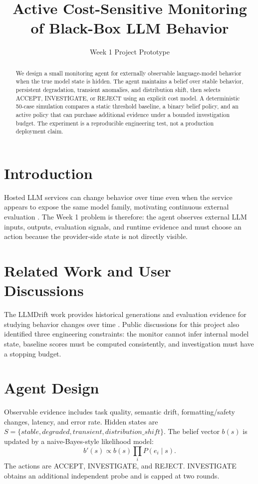 \documentclass[10pt]{article}
\title{Active Cost-Sensitive Monitoring of Black-Box LLM Behavior}
\author{Week 1 Project Prototype}
\date{}
\begin{document}
\maketitle
\begin{abstract}
We design a small monitoring agent for externally observable language-model behavior when the true model state is hidden. The agent maintains a belief over stable behavior, persistent degradation, transient anomalies, and distribution shift, then selects ACCEPT, INVESTIGATE, or REJECT using an explicit cost model. A deterministic 50-case simulation compares a static threshold baseline, a binary belief policy, and an active policy that can purchase additional evidence under a bounded investigation budget. The experiment is a reproducible engineering test, not a production deployment claim.
\end{abstract}

\section{Introduction}
Hosted LLM services can change behavior over time even when the service appears to expose the same model family, motivating continuous external evaluation \cite{chen2023llmdrift}. The Week 1 problem is therefore: the agent observes external LLM inputs, outputs, evaluation signals, and runtime evidence and must choose an action because the provider-side state is not directly visible.

\section{Related Work and User Discussions}
The LLMDrift work provides historical generations and evaluation evidence for studying behavior changes over time \cite{chen2023llmdrift}. Public discussions for this project also identified three engineering constraints: the monitor cannot infer internal model state, baseline scores must be computed consistently, and investigation must have a stopping budget.

\section{Agent Design}
Observable evidence includes task quality, semantic drift, formatting/safety changes, latency, and error rate. Hidden states are $S=\{stable,degraded,transient,distribution\_shift\}$. The belief vector $b(s)$ is updated by a naive-Bayes-style likelihood model:
\[
b'(s) \propto b(s)\prod_i P(e_i\mid s).
\]
The actions are ACCEPT, INVESTIGATE, and REJECT. INVESTIGATE obtains an additional independent probe and is capped at two rounds.
\end{document}
